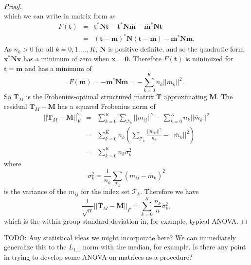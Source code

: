 \documentclass[letterpaper,12pt,oneside,final]{article}
\newcommand{\ve}[1]{\mathbf{#1}}           %
\newcommand{\m}[1]{\mathbf{#1}}               %
\newcommand{\conj}[1]{{#1}^{\ast}}
\newcommand{\norm}[1]{||{#1}||}              %
\newcommand{\frob}[1]{\norm{#1}_F}
\newcommand{\widebar}[1]{\overline{#1}}
\newcommand{\TODO}[1]{{\color{brickred} TODO:  {#1}}}
\begin{document}
\begin{proof}
\begin{equation*}
  \end{equation*}
  which we can write in matrix form as
  \begin{eqnarray}
    F(\ve{t}) & = & \conj{ \ve{t} } \m{N} \ve{t} - \conj{ \ve{t} } \m{N} \widebar{ \ve{m} } - \conj{ \widebar { \ve{m} } } \m{N} \ve{t} \nonumber \\
              & = & \conj{ \left ( \ve{t} - \widebar{ \ve{m} } \right ) } \m{N}  \left ( \ve{t} - \widebar{ \ve{m} } \right ) - \conj{ \widebar{ \ve{m} } } \m{N} \widebar{ \ve{m} }.
  \end{eqnarray}
  As $n_k > 0$ for all $k = 0, 1, \dots, K$, $\m{N}$ is positive definite, and so the quadratic form $\conj{ \ve{x} } \m{N} \ve{x}$ has a minimum of zero when $\ve{x} = \ve{0}$. Therefore $F(\ve{t})$ is minimized for $\ve{t} = \widebar{ \ve{ m } }$ and has a minimum of
  \begin{equation} \label{eq:Fmin}
    F(\widebar{ \ve{m} }) = - \conj{ \widebar{ \ve{m} } } \m{N} \widebar{ \ve{m} } = - \sum_{k = 0}^K n_k \norm{\widebar{m}_k}^2.
  \end{equation}
  So $\m{T}_M$ is the Frobenius-optimal structured matrix $\m{T}$ approximating $\m{M}$. The residual $\m{T}_M - \m{M}$ has a squared Frobenius norm of
  \begin{eqnarray}
    \frob{\m{T}_M - \m{M}}^2 & = & \sum_{k = 0}^K \sum_{\mathcal{T}_k} \norm{m_{ij}}^2 - \sum_{k = 0}^K n_k \norm{\widebar{m}_k}^2 \nonumber \\
                             & = & \sum_{k = 0}^K n_k \left ( \sum_{\mathcal{T}_k} \frac{\norm{m_{ij}}^2}{n_k} - \norm{\widebar{m}_k}^2  \right ) \nonumber \\
                             & = & \sum_{k = 0}^K n_k \sigma_k^2 \label{eq:TMmin}
  \end{eqnarray}
  where
  $$\sigma_k^2 = \frac{1}{n_k} \sum_{\mathcal{T}_k} \left ( m_{ij} - \widebar{m}_k \right ) ^2$$
  is the variance of the $m_{ij}$ for the index set $\mathcal{T}_k$. Therefore we have
  \begin{equation*}
    \frac{1}{\sqrt{n}}\frob{\m{T}_M - \m{M}} = \sum_{k = 0}^K \frac{n_k}{n} \sigma_k^2,
  \end{equation*}
  which is the within-group standard deviation in, for example, typical ANOVA.
\end{proof}

\TODO{Any statistical ideas we might incorporate here? We can immediately generalize this to the $L_{1,1}$ norm with the median, for example. Is there any point in trying to develop some ANOVA-on-matrices as a procedure?}
\end{document}
